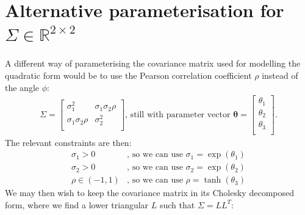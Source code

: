 \documentclass[a4paper, 12pt]{report}
\begin{document}
\section{Alternative parameterisation for $\Sigma \in \mathbb{R}^{2\times 2}$}
A different way of parameterising the covariance matrix used for modelling the quadratic form would be to use the Pearson correlation coefficient $\rho$ instead of the angle $\phi$:
\begin{align}
\Sigma = \begin{bmatrix}
 \sigma_1^2 & \sigma_1\sigma_2\rho \\
  \sigma_1\sigma_2\rho & \sigma_2^2 \\
\end{bmatrix} \textrm{, still with parameter vector } \boldsymbol{\theta}=\begin{bmatrix}
	\theta_1\\
	\theta_2\\
	\theta_3\\
\end{bmatrix}.
\end{align}
The relevant constraints are then:
\begin{align}
	\sigma_1 > 0& \textrm{, so we can use } \sigma_1 = \exp(\theta_1)\\
	\sigma_2 > 0& \textrm{, so we can use } \sigma_2 = \exp(\theta_2)\\
	\rho \in (-1, 1) & \textrm{, so we can use } \rho = \tanh(\theta_3)
\end{align}
We may then wish to keep the covariance matrix in its Cholesky decomposed form, where we find a lower triangular $L$ such that $\Sigma=LL^T$:
\end{document}
